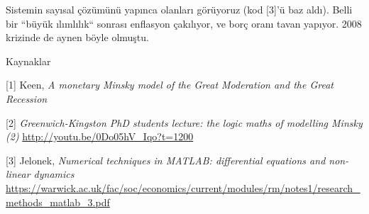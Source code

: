 \documentclass[12pt,fleqn]{article}\usepackage{../../common}
\begin{document}
Sistemin sayısal çözümünü yapınca olanları görüyoruz (kod [3]'ü baz
aldı). Belli bir ``büyük ılımlılık`` sonrası enflasyon çakılıyor, ve borç
oranı tavan yapıyor. 2008 krizinde de aynen böyle olmuştu.

Kaynaklar

[1] Keen, {\em A monetary Minsky model of the Great Moderation and the Great Recession}

[2] {\em Greenwich-Kingston PhD students lecture: the logic  maths of modelling Minsky (2)} \url{http://youtu.be/0Do05hV_Iqo?t=1200}

[3] Jelonek, {\em Numerical techniques in MATLAB: differential equations and non-linear dynamics} \url{https://warwick.ac.uk/fac/soc/economics/current/modules/rm/notes1/research_methods_matlab_3.pdf}
\end{document}

